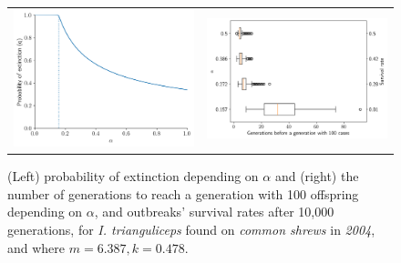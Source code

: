 \documentclass[hidelinks]{article}
\begin{document}
\begin{figure}[]
	\begin{mdframed}[backgroundcolor=grey250,rightline=false,leftline=false,topline=false]
		\centering
		\begin{tabular}{ll}
			\includegraphics[width=.46\linewidth,valign=m]{extinctionProbability2004_I. trianguliceps_SA} & \includegraphics[width=.50\linewidth,valign=m]{firstGeneration100_2004_I. trianguliceps_SA}
		\end{tabular}
		\caption{(Left) probability of extinction depending on $ \alpha $ and (right) the number of generations to reach a generation with 100 offspring depending on $ \alpha $, and  outbreaks' survival rates after 10,000 generations, for \textit{I. trianguliceps} found on \textit{common shrews} in \textit{2004}, and where $ m = 6.387, k = 0.478 $. }
		\label{fig:simulation_2004_itrianguliceps_SA}
	\end{mdframed}
\end{figure}
\end{document}

